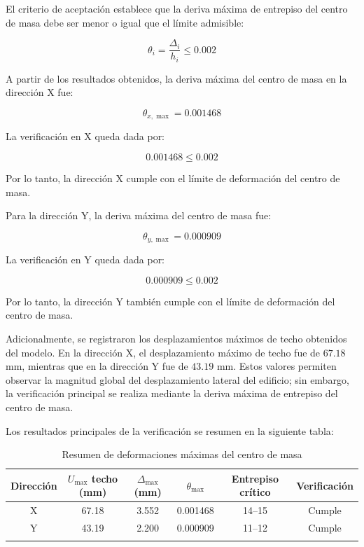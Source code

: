 El criterio de aceptación establece que la deriva máxima de entrepiso del centro de masa debe ser menor o igual que el límite admisible:

\begin{equation}
\theta_i = \frac{\Delta_i}{h_i} \leq 0.002
\end{equation}

A partir de los resultados obtenidos, la deriva máxima del centro de masa en la dirección X fue:

\begin{equation}
\theta_{x,\max} = 0.001468
\end{equation}

La verificación en X queda dada por:

\begin{equation}
0.001468 \leq 0.002
\end{equation}

Por lo tanto, la dirección X cumple con el límite de deformación del centro de masa.

Para la dirección Y, la deriva máxima del centro de masa fue:

\begin{equation}
\theta_{y,\max} = 0.000909
\end{equation}

La verificación en Y queda dada por:

\begin{equation}
0.000909 \leq 0.002
\end{equation}

Por lo tanto, la dirección Y también cumple con el límite de deformación del centro de masa.

Adicionalmente, se registraron los desplazamientos máximos de techo obtenidos del modelo. En la dirección X, el desplazamiento máximo de techo fue de $67.18$ mm, mientras que en la dirección Y fue de $43.19$ mm. Estos valores permiten observar la magnitud global del desplazamiento lateral del edificio; sin embargo, la verificación principal se realiza mediante la deriva máxima de entrepiso del centro de masa.

Los resultados principales de la verificación se resumen en la siguiente tabla:

\begin{table}[H]
    \centering
    \caption{Resumen de deformaciones máximas del centro de masa}
    \begin{tabular}{cccccc}
    \hline
    Dirección & $U_{\max}$ techo (mm) & $\Delta_{\max}$ (mm) & $\theta_{\max}$ & Entrepiso crítico & Verificación \\
    \hline
    X & 67.18 & 3.552 & 0.001468 & 14--15 & Cumple \\
    Y & 43.19 & 2.200 & 0.000909 & 11--12 & Cumple \\
    \hline
        \vspace{0.001cm}
    \end{tabular}
    
\end{table}

